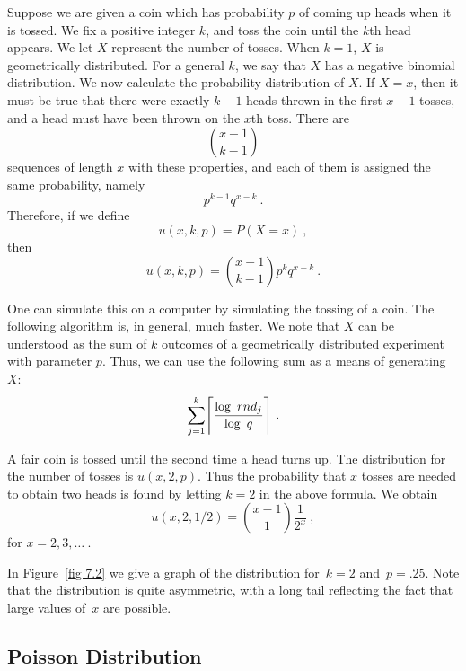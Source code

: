 Suppose we are given a coin which has probability $p$ of coming up heads when it is
tossed.  We fix a positive integer $k$, and toss the coin until the $k$th head
appears.  We let $X$ represent the number of tosses.  When $k = 1$, $X$ is
geometrically distributed.  For a general $k$, we say that $X$ has a negative binomial
distribution. We now calculate the probability distribution of $X$.  If $X = x$, then
it must be true that there were exactly $k-1$ heads thrown in the first $x-1$ tosses,
and a head must have been thrown on the $x$th toss.  There are
$${{x-1}\choose{k-1}}$$ 
sequences of length $x$ with these properties, and each of
them is assigned the same
probability, namely
$$p^{k-1}q^{x-k}\ .$$ Therefore, if we define 
$$u(x, k, p) = P(X = x)\ ,$$
then
$$u(x, k, p) = {{x-1}\choose{k-1}}p^kq^{x-k}\ .$$
\par One can simulate this on a computer by simulating the tossing of a coin.  The
following algorithm is, in general, much faster.  We note that $X$ can be understood
as the sum of $k$ outcomes of a geometrically distributed experiment with parameter $p$. 
Thus, we can use the following sum as a means of generating $X$:
$$\sum_{j = 1}^k \Biggl\lceil {{\log\ rnd_j}\over{\log\ q}}\Biggr\rceil\ .$$

\begin{example} A fair coin is tossed until the second time a head turns up.  The
distribution for the number of tosses is $u(x, 2, p)$.  Thus the
probability that $x$ tosses are needed to obtain two heads is found by letting
$k = 2$ in the above formula.  We obtain
$$  u(x, 2, 1/2) =  {{x-1} \choose 1} \frac 1{2^x}\ ,$$ 
for $x = 2, 3, \ldots\ $.
\par
In Figure~\ref{fig 7.2} we give a graph of the distribution for~$k = 2$ and~$p = .25$. 
Note that the distribution is quite asymmetric, with a long tail reflecting the fact that
large values of~$x$ are possible.
\end{example}



\subsection*{Poisson Distribution}

